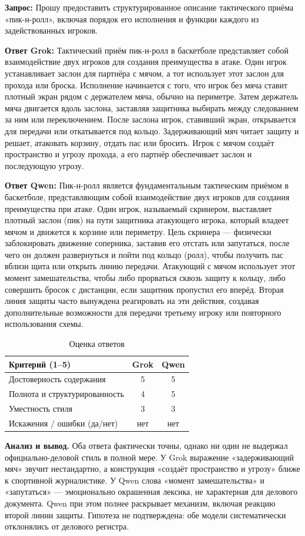 \documentclass[a4paper, final]{article}
\newcommand{\scoretablefilled}[8]{%
    \vspace{4pt}
    \begin{table}[h!]
    \centering
    \small
    \begin{tabular}{|l|c|c|}
    \hline
    \textbf{Критерий (1--5)} & \textbf{Grok} & \textbf{Qwen} \\
    \hline
    Достоверность содержания & #1 & #2 \\
    \hline
    Полнота и структурированность & #3 & #4 \\
    \hline
    Уместность стиля & #5 & #6 \\
    \hline
    Искажения / ошибки (да/нет) & #7 & #8 \\
    \hline
    \end{tabular}
    \caption{Оценка ответов}
    \end{table}
    \vspace{2pt}
}
\begin{document}
\noindent\textbf{Запрос:} Прошу предоставить структурированное описание тактического приёма «пик-н-ролл», включая порядок его исполнения и функции каждого из задействованных игроков.

\noindent\textbf{Ответ Grok:} Тактический приём пик-н-ролл в баскетболе представляет собой взаимодействие двух игроков для создания преимущества в атаке. Один игрок устанавливает заслон для партнёра с мячом, а тот использует этот заслон для прохода или броска. Исполнение начинается с того, что игрок без мяча ставит плотный экран рядом с держателем мяча, обычно на периметре. Затем держатель мяча двигается вдоль заслона, заставляя защитника выбирать между следованием за ним или переключением. После заслона игрок, ставивший экран, открывается для передачи или откатывается под кольцо. Задерживающий мяч читает защиту и решает, атаковать корзину, отдать пас или бросить. Игрок с мячом создаёт пространство и угрозу прохода, а его партнёр обеспечивает заслон и последующую угрозу.

\noindent\textbf{Ответ Qwen:} Пик-н-ролл является фундаментальным тактическим приёмом в баскетболе, представляющим собой взаимодействие двух игроков для создания преимущества при атаке. Один игрок, называемый скринером, выставляет плотный заслон (пик) на пути защитника атакующего игрока, который владеет мячом и движется к корзине или периметру. Цель скринера — физически заблокировать движение соперника, заставив его отстать или запутаться, после чего он должен развернуться и пойти под кольцо (ролл), чтобы получить пас вблизи щита или открыть линию передачи. Атакующий с мячом использует этот момент замешательства, чтобы либо прорваться сквозь защиту к кольцу, либо совершить бросок с дистанции, если защитник пропустил его вперёд. Вторая линия защиты часто вынуждена реагировать на эти действия, создавая дополнительные возможности для передачи третьему игроку или повторного использования схемы.

\scoretablefilled{5}{5}{4}{5}{3}{3}{нет}{нет}

\noindent\textbf{Анализ и вывод.} Оба ответа фактически точны, однако ни один не выдержал официально-деловой стиль в полной мере. У Grok выражение «задерживающий мяч» звучит нестандартно, а конструкция «создаёт пространство и угрозу» ближе к спортивной журналистике. У Qwen слова «момент замешательства» и «запутаться» — эмоционально окрашенная лексика, не характерная для делового документа. Qwen при этом полнее раскрывает механизм, включая реакцию второй линии защиты. Гипотеза не подтверждена: обе модели систематически отклонялись от делового регистра.
\end{document}
